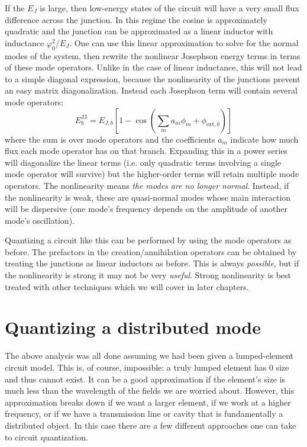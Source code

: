 If the $E_J$ is large, then low-energy states of the circuit will have a very small flux difference across the junction. In this regime the cosine is approximately quadratic and the junction can be approximated as a linear inductor with inductance $\varphi_0^2/E_J$. One can use this linear approximation to solve for the normal modes of the system, then rewrite the nonlinear Josephson energy terms in terms of these mode operators. Unlike in the case of linear inductance, this will not lead to a simple diagonal expression, because the nonlinearity of the junctions prevent an easy matrix diagonalization. Instead each Josephson term will contain several mode operators:
\begin{equation*}
	E^{\mathrm{JJ}}_b = E_{J,b}\left[1-\cos\left(\sum_m a_m\phi_m +\phi_{\mathrm{ext},b}\right)\right]
\end{equation*}
where the sum is over mode operators and the coefficients $a_m$ indicate how much flux each mode operator has on that branch. Expanding this in a power series will diagonalize the linear terms (i.e. only quadratic terms involving a single mode operator will survive) but the higher-order terms will retain multiple mode operators. The nonlinearity means \textit{the modes are no longer normal}. Instead, if the nonlinearity is weak, these are quasi-normal modes whose main interaction will be dispersive (one mode's frequency depends on the amplitude of another mode's oscillation). 

Quantizing a circuit like this can be performed by using the mode operators as before. The prefactors in the creation/annihilation operators can be obtained by treating the junctions as linear inductors as before. This is always \textit{possible}, but if the nonlinearity is strong it may not be very \textit{useful}. Strong nonlinearity is best treated with other techniques which we will cover in later chapters.

\section{Quantizing a distributed mode}
\label{sec:distributedQuant}
The above analysis was all done assuming we had been given a lumped-element circuit model. This is, of course, impossible: a truly lumped element has 0 size and thus cannot exist. It can be a good approximation if the element's size is much less than the wavelength of the fields we are worried about. However, this approximation breaks down if we want a larger element, if we work at a higher frequency, or if we have a transmission line or cavity that is fundamentally a distributed object. In this case there are a few different approaches one can take to circuit quantization. 

